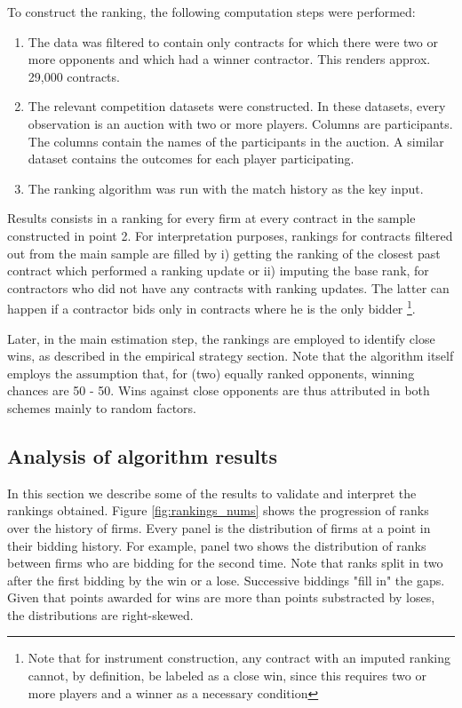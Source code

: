 To construct the ranking, the following computation steps were performed:
\begin{enumerate}[itemsep=1pt]
  \item The data was filtered to contain only contracts for which there were two or more opponents and which had a winner contractor. This renders approx. 29,000 contracts.
  \item The relevant competition datasets were constructed. In these datasets, every observation is an auction with two or more players. Columns are participants. The columns contain the names of the participants in the auction. A similar dataset contains the outcomes for each player participating.
  \item The ranking algorithm was run with the match history as the key input.
\end{enumerate}
Results consists in a ranking for every firm at every contract in the sample constructed in point 2. For interpretation purposes, rankings for contracts filtered out from the main sample are filled by i) getting the ranking of the closest past contract which performed a ranking update or ii) imputing the base rank, for contractors who did not have any contracts with ranking updates. The latter can happen if a contractor bids only in contracts where he is the only bidder \footnote{Note that for instrument construction, any contract with an imputed ranking cannot, by definition, be labeled as a close win, since this requires two or more players and a winner as a necessary condition}.

Later, in the main estimation step, the rankings are employed to identify close wins, as described in the empirical strategy section. Note that the algorithm itself employs the assumption that, for (two) equally ranked opponents, winning chances are 50 - 50. Wins against close opponents are thus attributed in both schemes mainly to random factors.

\subsection{Analysis of algorithm results}
In this section we describe some of the results to validate and interpret the rankings obtained. Figure \ref{fig:rankings_nums} shows the progression of ranks over the history of firms. Every panel is the distribution of firms at a point in their bidding history. For example, panel two shows the distribution of ranks between firms who are bidding for the second time. Note that ranks split in two after the first bidding by the win or a lose. Successive biddings "fill in" the gaps. Given that points awarded for wins are more than points substracted by loses, the distributions are right-skewed.

